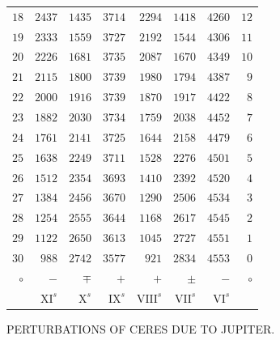 \begin{center}
\begin{tabular}{r|r|r|r|r|r|r|r}
$18$ & $2437$ & $1435$ & $3714$ & $2294$ & $1418$ & $4260$ & $12$ \\
$19$ & $2333$ & $1559$ & $3727$ & $2192$ & $1544$ & $4306$ & $11$ \\
$20$ & $2226$ & $1681$ & $3735$ & $2087$ & $1670$ & $4349$ & $10$ \\[3pt]
$21$ & $2115$ & $1800$ & $3739$ & $1980$ & $1794$ & $4387$ & $9$ \\
$22$ & $2000$ & $1916$ & $3739$ & $1870$ & $1917$ & $4422$ & $8$ \\
$23$ & $1882$ & $2030$ & $3734$ & $1759$ & $2038$ & $4452$ & $7$ \\
$24$ & $1761$ & $2141$ & $3725$ & $1644$ & $2158$ & $4479$ & $6$ \\
$25$ & $1638$ & $2249$ & $3711$ & $1528$ & $2276$ & $4501$ & $5$ \\[3pt]
$26$ & $1512$ & $2354$ & $3693$ & $1410$ & $2392$ & $4520$ & $4$ \\
$27$ & $1384$ & $2456$ & $3670$ & $1290$ & $2506$ & $4534$ & $3$ \\
$28$ & $1254$ & $2555$ & $3644$ & $1168$ & $2617$ & $4545$ & $2$ \\
$29$ & $1122$ & $2650$ & $3613$ & $1045$ & $2727$ & $4551$ & $1$ \\
$30$ & $988$ & $2742$ & $3577$ & $921$ & $2834$ & $4553$ & $0$ \\
\hline $\circ$ & $-$ & $\mp$ & $+$ & $+$ & $\pm$ & $-$ & $\circ$ \\
 & $\mathrm{XI}^s$ & $\mathrm{X}^s$ & $\mathrm{IX}^s$ & $\mathrm{VIII}^s$ & $\mathrm{VII}^s$ & $\mathrm{VI}^s$ & \\
\end{tabular}\endgroup
\end{center}

\clearpage

%

\begin{center}PERTURBATIONS OF CERES DUE TO JUPITER.\end{center}

